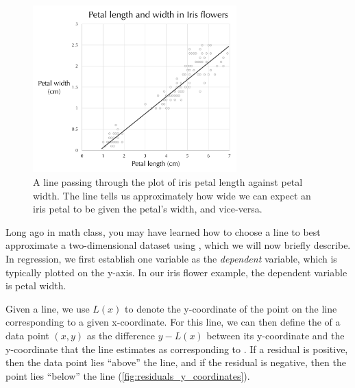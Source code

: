 \begin{figure}[h]
\centering
\mySfFamily
\includegraphics[width = 0.7\textwidth]{../images/iris_flowers_regression_line.png}
\caption{A line passing through the plot of iris petal length against petal width. The line tells us approximately how wide we can expect an iris petal to be given the petal's width, and vice-versa.}
\label{fig:iris_flowers_regression_line}
\end{figure}

\begin{qbox}\end{qbox}

Long ago in math class, you may have learned how to choose a line to best approximate a two-dimensional dataset using , which we will now briefly describe. In regression, we first establish one variable as the \textit{dependent} variable, which is typically plotted on the y-axis. In our iris flower example, the dependent variable is petal width.

Given a line, we use $L(x)$ to denote the y-coordinate of the point on the line corresponding to a given x-coordinate. For this line, we can then define the  of a data point $(x, y)$ as the difference $y - L(x)$ between its y-coordinate and the y-coordinate that the line estimates as corresponding to . If a residual is positive, then the data point lies ``above'' the line, and if the residual is negative, then the point lies ``below'' the line (\autoref{fig:residuals_y_coordinates}).\\

